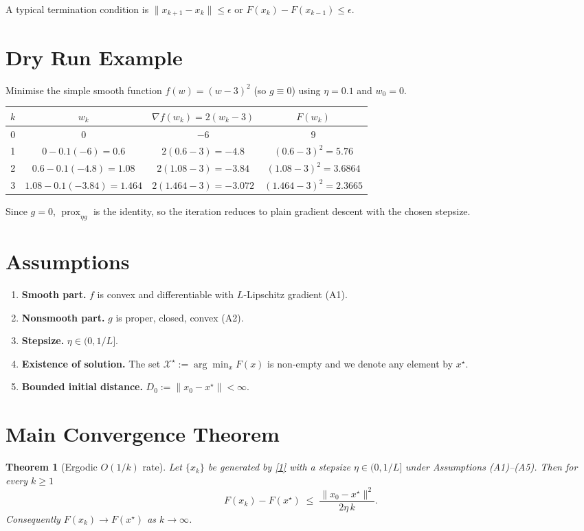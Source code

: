 \documentclass{article}
\newtheorem{theorem}{Theorem}
\newcommand{\prox}{\operatorname{prox}}
\newcommand{\grad}{\nabla}
\begin{document}
A typical termination condition is $\|x_{k+1}-x_{k}\|\le \epsilon$ or $F(x_{k})-F(x_{k-1})\le\epsilon$.

\section*{Dry Run Example}
Minimise the simple smooth function $f(w)=(w-3)^{2}$ (so $g\equiv0$) using $\eta=0.1$ and $w_{0}=0$.

\begin{center}
\begin{tabular}{c|c|c|c}
$k$ & $w_{k}$ & $\grad f(w_{k})=2(w_{k}-3)$ & $F(w_{k})$ \\
\hline
0 & $0$ & $-6$ & $9$ \\
1 & $0-0.1(-6)=0.6$ & $2(0.6-3)=-4.8$ & $(0.6-3)^{2}=5.76$ \\
2 & $0.6-0.1(-4.8)=1.08$ & $2(1.08-3)=-3.84$ & $(1.08-3)^{2}=3.6864$ \\
3 & $1.08-0.1(-3.84)=1.464$ & $2(1.464-3)=-3.072$ & $(1.464-3)^{2}=2.3665$
\end{tabular}
\end{center}
Since $g=0$, $\prox_{\eta g}$ is the identity, so the iteration reduces to plain gradient descent with the chosen stepsize.

\section*{Assumptions}
\begin{enumerate}[label=(A\arabic*)]
\item \textbf{Smooth part.} $f$ is convex and differentiable with $L$‑Lipschitz gradient (A1).  
\item \textbf{Nonsmooth part.} $g$ is proper, closed, convex (A2).  
\item \textbf{Stepsize.} $\eta\in(0,1/L]$.  
\item \textbf{Existence of solution.} The set $\mathcal{X}^{\star}:=\arg\min_{x}F(x)$ is non‑empty and we denote any element by $x^{\star}$.  
\item \textbf{Bounded initial distance.} $D_{0}:=\|x_{0}-x^{\star}\|<\infty$.
\end{enumerate}

\section*{Main Convergence Theorem}
\begin{theorem}[Ergodic $O(1/k)$ rate]\label{thm:rate}
Let $\{x_{k}\}$ be generated by \eqref{1} with a stepsize $\eta\in(0,1/L]$ under Assumptions (A1)–(A5). Then for every $k\ge1$
\[
F(x_{k})-F(x^{\star})\;\le\;\frac{\|x_{0}-x^{\star}\|^{2}}{2\eta\,k}.
\tag{2}
\]
Consequently $F(x_{k})\to F(x^{\star})$ as $k\to\infty$.
\end{theorem}
\end{document}
